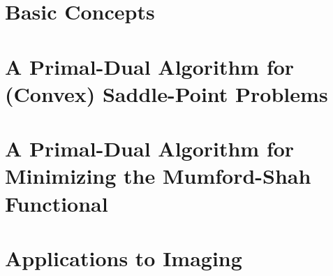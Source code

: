 \documentclass{scrreprt}
\begin{document}





\chapter{Basic Concepts} %
\label{cha:basic_concepts}

    
    
    


\chapter{A Primal-Dual Algorithm for (Convex) Saddle-Point Problems} %
\label{cha:a_first_order_primal_dual_algorithm_for_convex_saddle_point_problems}
    
    
    
    
    
    
    


\chapter{A Primal-Dual Algorithm for Minimizing the Mumford-Shah Functional} %
\label{cha:a_first_order_primal_dual_algorithm_for_minimizing_the_mumford_shah_functional}
    
    
    
    
    
    


\chapter{Applications to Imaging} %
\label{cha:applications_to_imaging}

    
    
    
    







\end{document}
